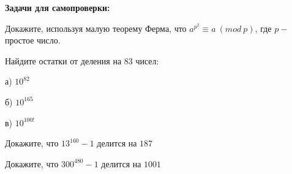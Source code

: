 \textbf{Задачи для самопроверки:}

 Докажите, используя малую теорему Ферма, что $a^{p^2} \equiv a \ (mod \ p)$, где $p -$ простое число.

 Найдите остатки от деления на 83 чисел:

а) $10^{82}$

б) $10^{165}$

в) $10^{100!}$

 Докажите, что $13^{160} - 1$ делится на $187$

 Докажите, что $300^{480} - 1$ делится на $1001$